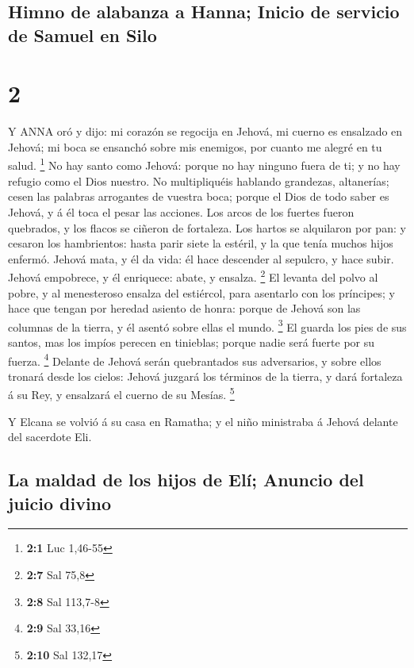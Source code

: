 \hypertarget{himno-de-alabanza-a-hanna-inicio-de-servicio-de-samuel-en-silo}{%
\subsection{Himno de alabanza a Hanna; Inicio de servicio de Samuel en
Silo}\label{himno-de-alabanza-a-hanna-inicio-de-servicio-de-samuel-en-silo}}

\hypertarget{section-1}{%
\section{2}\label{section-1}}

 Y ANNA oró y dijo: mi corazón se regocija en Jehová, mi
cuerno es ensalzado en Jehová; mi boca se ensanchó sobre mis enemigos,
por cuanto me alegré en tu salud. \footnote{\textbf{2:1} Luc 1,46-55}
 No hay santo como Jehová: porque no hay ninguno fuera de
ti; y no hay refugio como el Dios nuestro.  No multipliquéis
hablando grandezas, altanerías; cesen las palabras arrogantes de vuestra
boca; porque el Dios de todo saber es Jehová, y á él toca el pesar las
acciones.  Los arcos de los fuertes fueron quebrados, y los
flacos se ciñeron de fortaleza.  Los hartos se alquilaron
por pan: y cesaron los hambrientos: hasta parir siete la estéril, y la
que tenía muchos hijos enfermó.  Jehová mata, y él da vida:
él hace descender al sepulcro, y hace subir.  Jehová
empobrece, y él enriquece: abate, y ensalza. \footnote{\textbf{2:7} Sal
  75,8}  El levanta del polvo al pobre, y al menesteroso
ensalza del estiércol, para asentarlo con los príncipes; y hace que
tengan por heredad asiento de honra: porque de Jehová son las columnas
de la tierra, y él asentó sobre ellas el mundo. \footnote{\textbf{2:8}
  Sal 113,7-8}  El guarda los pies de sus santos, mas los
impíos perecen en tinieblas; porque nadie será fuerte por su fuerza.
\footnote{\textbf{2:9} Sal 33,16}  Delante de Jehová serán
quebrantados sus adversarios, y sobre ellos tronará desde los cielos:
Jehová juzgará los términos de la tierra, y dará fortaleza á su Rey, y
ensalzará el cuerno de su Mesías. \footnote{\textbf{2:10} Sal 132,17}

 Y Elcana se volvió á su casa en Ramatha; y el niño
ministraba á Jehová delante del sacerdote Eli.

\hypertarget{la-maldad-de-los-hijos-de-eluxed-anuncio-del-juicio-divino}{%
\subsection{La maldad de los hijos de Elí; Anuncio del juicio
divino}\label{la-maldad-de-los-hijos-de-eluxed-anuncio-del-juicio-divino}}

